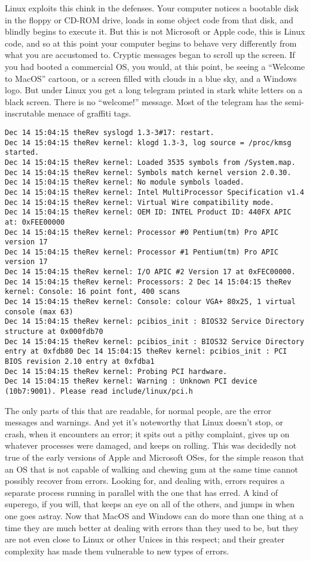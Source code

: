 \documentclass[
  fontsize=11pt,
  paper=landscape,
  twocolumn=true,
  pagesize=pdftex,
  headings=small,
  DIV=15,
  ]{scrartcl}
\begin{document}
Linux exploits this chink in the defenses. Your computer notices a
bootable disk in the floppy or CD-ROM drive, loads in some object code
from that disk, and blindly begins to execute it. But this is not
Microsoft or Apple code, this is Linux code, and so at this point your
computer begins to behave very differently from what you are accustomed
to. Cryptic messages began to scroll up the screen. If you had booted a
commercial OS, you would, at this point, be seeing a ``Welcome to
MacOS'' cartoon, or a screen filled with clouds in a blue sky, and a
Windows logo. But under Linux you get a long telegram printed in stark
white letters on a black screen. There is no ``welcome!'' message. Most
of the telegram has the semi-inscrutable menace of graffiti tags.

\begin{lstlisting}
Dec 14 15:04:15 theRev syslogd 1.3-3#17: restart.
Dec 14 15:04:15 theRev kernel: klogd 1.3-3, log source = /proc/kmsg started.
Dec 14 15:04:15 theRev kernel: Loaded 3535 symbols from /System.map.
Dec 14 15:04:15 theRev kernel: Symbols match kernel version 2.0.30.
Dec 14 15:04:15 theRev kernel: No module symbols loaded.
Dec 14 15:04:15 theRev kernel: Intel MultiProcessor Specification v1.4 
Dec 14 15:04:15 theRev kernel: Virtual Wire compatibility mode.
Dec 14 15:04:15 theRev kernel: OEM ID: INTEL Product ID: 440FX APIC at: 0xFEE00000 
Dec 14 15:04:15 theRev kernel: Processor #0 Pentium(tm) Pro APIC version 17 
Dec 14 15:04:15 theRev kernel: Processor #1 Pentium(tm) Pro APIC version 17
Dec 14 15:04:15 theRev kernel: I/O APIC #2 Version 17 at 0xFEC00000.
Dec 14 15:04:15 theRev kernel: Processors: 2 Dec 14 15:04:15 theRev kernel: Console: 16 point font, 400 scans 
Dec 14 15:04:15 theRev kernel: Console: colour VGA+ 80x25, 1 virtual console (max 63) 
Dec 14 15:04:15 theRev kernel: pcibios_init : BIOS32 Service Directory structure at 0x000fdb70 
Dec 14 15:04:15 theRev kernel: pcibios_init : BIOS32 Service Directory entry at 0xfdb80 Dec 14 15:04:15 theRev kernel: pcibios_init : PCI BIOS revision 2.10 entry at 0xfdba1 
Dec 14 15:04:15 theRev kernel: Probing PCI hardware.
Dec 14 15:04:15 theRev kernel: Warning : Unknown PCI device (10b7:9001). Please read include/linux/pci.h 
\end{lstlisting}
The only parts of this that are readable, for normal people, are the
error messages and warnings. And yet it's noteworthy that Linux doesn't
stop, or crash, when it encounters an error; it spits out a pithy
complaint, gives up on whatever processes were damaged, and keeps on
rolling. This was decidedly not true of the early versions of Apple and
Microsoft OSes, for the simple reason that an OS that is not capable of
walking and chewing gum at the same time cannot possibly recover from
errors. Looking for, and dealing with, errors requires a separate
process running in parallel with the one that has erred. A kind of
superego, if you will, that keeps an eye on all of the others, and jumps
in when one goes astray. Now that MacOS and Windows can do more than one
thing at a time they are much better at dealing with errors than they
used to be, but they are not even close to Linux or other Unices in this
respect; and their greater complexity has made them vulnerable to new
types of errors.
\end{document}
